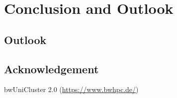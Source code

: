 \chapter{Conclusion and Outlook}


\section{Outlook}


\section{Acknowledgement}
bwUniCluster 2.0 (\url{https://www.bwhpc.de/})
